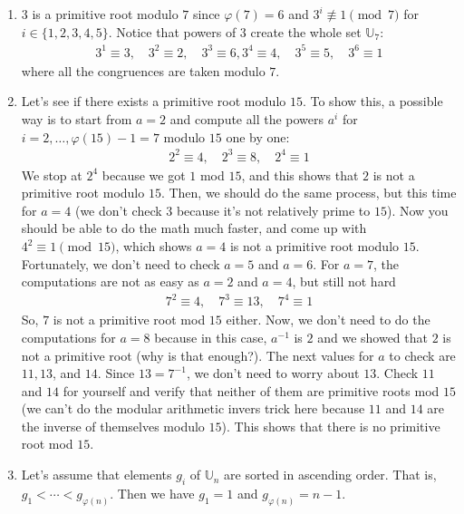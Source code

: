 \documentclass{subfile}
\begin{document}
		\begin{example}
		$ $
		\begin{enumerate}
			\item $3$ is a primitive root modulo $7$ since $\varphi(7)=6$ and $3^i\not\equiv1\pmod 7$ for $i\in\{1,2,3,4,5\}$. Notice that powers of $3$ create the whole set $\mathbb U_7$:
			\begin{align*}
				3^1 \equiv 3, \quad 3^2 \equiv 2, \quad 3^3 \equiv 6, 3^4 \equiv 4, \quad 3^5 \equiv 5, \quad 3^6 \equiv 1
			\end{align*}
			where all the congruences are taken modulo $7$.
			\item Let's see if there exists a primitive root modulo $15$. To show this, a possible way is to start from $a=2$ and compute all the powers $a^i$ for $i=2,\ldots,\varphi(15)-1=7$ modulo $15$ one by one:
				\begin{align*}
					2^2 \equiv 4, \quad 2^3 \equiv 8, \quad 2^4 \equiv 1
				\end{align*}
			We stop at $2^4$ because we got $1$ mod $15$, and this shows that $2$ is not a primitive root modulo $15$. Then, we should do the same process, but this time for $a=4$ (we don't check $3$ because it's not relatively prime to $15$). Now you should be able to do the math much faster, and come up with $4^2 \equiv 1 \pmod{15}$, which shows $a=4$ is not a primitive root modulo $15$. Fortunately, we don't need to check $a=5$ and $a=6$. For $a=7$, the computations are not as easy as $a=2$ and $a=4$, but still not hard
				\begin{align*}
					7^2 \equiv 4, \quad 7^3 \equiv 13, \quad 7^4 \equiv 1
				\end{align*}
			So, $7$ is not a primitive root mod $15$ either. Now, we don't need to do the computations for $a=8$ because in this case, $a^{-1}$ is $2$ and we showed that $2$ is not a primitive root (why is that enough?). The next values for $a$ to check are $11, 13$, and $14$. Since $13=7^{-1}$, we don't need to worry about $13$. Check $11$ and $14$ for yourself and verify that neither of them are primitive roots mod $15$ (we can't do the modular arithmetic invers trick here because $11$ and $14$ are the inverse of themselves modulo $15$). This shows that there is no primitive root mod $15$.

			\item Let's assume that elements $g_i$ of $\mathbb U_n$ are sorted in ascending order. That is, $g_1<\cdots<g_{\varphi(n)}$. Then we  have $g_1=1$ and $g_{\varphi(n)}=n-1$.
		\end{enumerate}
	\end{example}
\end{document}
